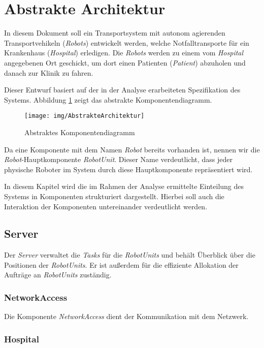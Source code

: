 \section{Abstrakte Architektur}
In diesem Dokument soll ein Transportsystem mit autonom agierenden Transportvehikeln (\emph{Robots})
entwickelt werden, welche Notfalltransporte für ein Krankenhaus (\emph{Hospital}) erledigen. Die \emph{Robots} werden zu
einem vom \emph{Hospital} angegebenen Ort geschickt, um dort einen Patienten (\emph{Patient}) abzuholen und
danach zur Klinik zu fahren.

Dieser Entwurf basiert auf der in der Analyse erarbeiteten Spezifikation des Systems. Abbildung \ref{KomponentendiagrammAbstrakt} zeigt das abstrakte Komponentendiagramm.

\begin{figure}[H]
	\centering
	\texttt{[image: img/AbstrakteArchitektur]}
	\caption{Abstraktes Komponentendiagramm}
	\label{KomponentendiagrammAbstrakt}
\end{figure}

Da eine Komponente mit dem Namen \emph{Robot} bereits vorhanden ist, nennen wir die \emph{Robot}-Hauptkomponente \emph{RobotUnit}. Dieser Name verdeutlicht, dass jeder physische Roboter im System durch diese Hauptkomponente repr\"{a}sentiert wird.


In diesem Kapitel wird die im Rahmen der Analyse ermittelte Einteilung des Systems in Komponenten strukturiert dargestellt. Hierbei soll auch die Interaktion der Komponenten untereinander verdeutlicht werden.

\subsection{Server}

Der \emph{Server} verwaltet die \emph{Tasks} f\"{u}r die \emph{RobotUnits} und beh\"{a}lt \"{U}berblick \"{u}ber die Positionen der \emph{RobotUnits}. Er ist außerdem f\"{u}r die effiziente Allokation der Auftr\"{a}ge an \emph{RobotUnits} zust\"{a}ndig.

\subsubsection{NetworkAccess}

Die Komponente \emph{NetworkAccess} dient der Kommunikation mit dem Netzwerk.

\subsubsection{Hospital}

